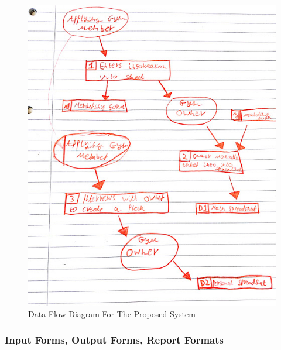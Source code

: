 \begin{figure}[H]
    \includegraphics[width=\textwidth]{ProposedDFD.jpg}
    \caption{Data Flow Diagram For The Proposed System} \label{fig:Data Flow Diagram For The Proposed System}
\end{figure}


\subsubsection{Input Forms, Output Forms, Report Formats}

